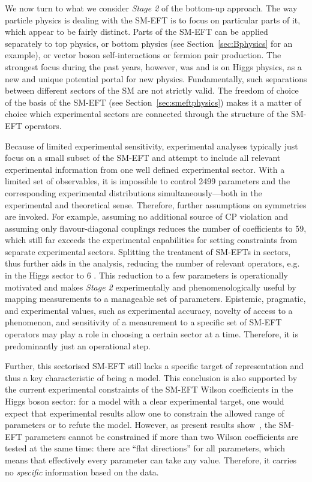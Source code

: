 We now turn to what we consider \emph{Stage 2} of the bottom-up approach.
The way particle physics is dealing with the SM-EFT is to focus on
particular parts of it, which appear to be fairly distinct. Parts of
the SM-EFT can be applied separately to top physics, or bottom
physics (see Section~\ref{sec:Bphysics} for an example), or vector boson
self-interactions or fermion pair production. The strongest focus
during the past years, however, was and is on Higgs physics, as a new
and unique potential portal for new physics.
Fundamentally, such separations between different sectors of the SM
are not strictly valid. The freedom of choice of the basis of the
SM-EFT (see Section~\ref{sec:smeftphysics}) makes it a matter of
choice which experimental sectors are connected through the structure
of the SM-EFT operators.


Because of limited experimental sensitivity, experimental analyses
typically just focus on a small subset of the SM-EFT and attempt to
include all relevant experimental information from one well defined
experimental sector. %
With a limited set of observables, it is impossible to control
2499 parameters and the corresponding experimental distributions
simultaneously---both in the experimental and theoretical
sense. Therefore, further assumptions on symmetries are invoked. For
example, assuming no additional source of CP violation and assuming
only flavour-diagonal couplings reduces the number of coefficients to
59, which still far exceeds the experimental capabilities for setting
constraints from separate experimental sectors. Splitting the
treatment of SM-EFTs in sectors, thus further aids in the analysis,
reducing the number of relevant operators, e.g. in the Higgs sector to
6 \citep{Buchmuller:1985jz,Grzadkowski:2010es}. This reduction to a
few parameters is operationally motivated and makes \emph{Stage 2} experimentally and
phenomenologically useful by mapping measurements to a manageable set
of parameters. Epistemic,
pragmatic, and experimental values, such as experimental accuracy,
novelty of access to a phenomenon, and sensitivity of a measurement to
a specific set of SM-EFT operators may play a role in choosing a
certain sector at a time. Therefore, it is predominantly just an
operational step.  

Further, this sectorised SM-EFT still lacks a specific target of representation and thus a key characteristic of being a model. 
This conclusion is also
supported by the current experimental constraints of the SM-EFT Wilson
coefficients in the Higgs boson sector: for a model with a clear
experimental target, one would expect that experimental results allow one
to constrain the allowed range of parameters or to refute the
model. However, as present results show~\citep{ATL-PHYS-PUB-2019-042},
the SM-EFT parameters cannot be constrained if more than two Wilson
coefficients are tested at the same time: there are ``flat
directions'' for all parameters, which means that effectively every
parameter can take any value. Therefore, it carries no
\emph{specific} information based on the data.

